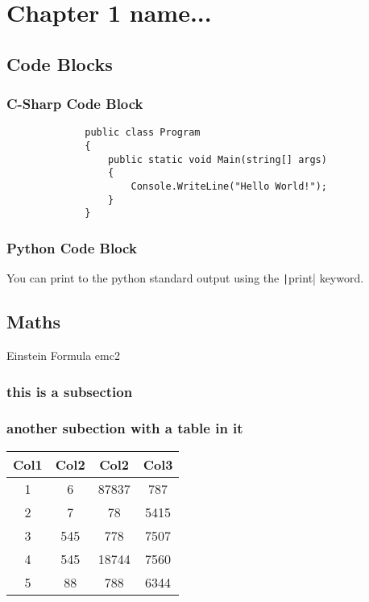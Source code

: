 \chapter{Chapter 1 name...}


\section{Code Blocks}

\subsection{C-Sharp Code Block}

\begin{figure}[ht]
    \begin{verbatim}
        public class Program
        {
            public static void Main(string[] args)
            {
                Console.WriteLine("Hello World!");
            }
        }
    \end{verbatim}
\end{figure}


\subsection{Python Code Block}

You can print to the python standard output using the \texttt|print| keyword. 

\newpage


\section{Maths}

{Einstein Formula}
{emc2}

\subsection{this is a subsection}

\lipsum[7-8]

\subsection{another subection with a table in it}


\begin{table}[h!]
\centering
\begin{tabular}{||c|c|c|c||} 
 \hline
 Col1 & Col2 & Col2 & Col3 \\ [0.5ex] 
 \hline\hline
 1 & 6 & 87837 & 787 \\ 
 2 & 7 & 78 & 5415 \\
 3 & 545 & 778 & 7507 \\
 4 & 545 & 18744 & 7560 \\
 5 & 88 & 788 & 6344 \\ [1ex] 
 \hline
\end{tabular}
\end{table}

\newpage